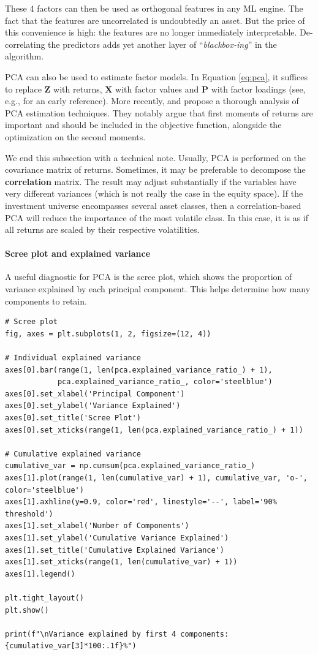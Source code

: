 \bigskip

These 4 factors can then be used as orthogonal features in any ML engine. The fact that the features are uncorrelated is undoubtedly an asset. But the price of this convenience is high: the features are no longer immediately interpretable. De-correlating the predictors adds yet another layer of ``\textit{blackbox-ing}'' in the algorithm.

PCA can also be used to estimate factor models. In Equation \ref{eq:pca}, it suffices to replace $\textbf{Z}$ with returns, $\textbf{X}$ with factor values and $\textbf{P}$ with factor loadings (see, e.g., \cite{connor1988risk} for an early reference). More recently, \cite{lettau2018estimating} and \cite{lettau2018factors} propose a thorough analysis of PCA estimation techniques. They notably argue that first moments of returns are important and should be included in the objective function, alongside the optimization on the second moments.

We end this subsection with a technical note. Usually, PCA is performed on the covariance matrix of returns. Sometimes, it may be preferable to decompose the \textbf{correlation} matrix. The result may adjust substantially if the variables have very different variances (which is not really the case in the equity space). If the investment universe encompasses several asset classes, then a correlation-based PCA will reduce the importance of the most volatile class. In this case, it is as if all returns are scaled by their respective volatilities.

\paragraph{Scree plot and explained variance}

A useful diagnostic for PCA is the scree plot, which shows the proportion of variance explained by each principal component. This helps determine how many components to retain.

\begin{verbatim}
# Scree plot
fig, axes = plt.subplots(1, 2, figsize=(12, 4))

# Individual explained variance
axes[0].bar(range(1, len(pca.explained_variance_ratio_) + 1), 
            pca.explained_variance_ratio_, color='steelblue')
axes[0].set_xlabel('Principal Component')
axes[0].set_ylabel('Variance Explained')
axes[0].set_title('Scree Plot')
axes[0].set_xticks(range(1, len(pca.explained_variance_ratio_) + 1))

# Cumulative explained variance
cumulative_var = np.cumsum(pca.explained_variance_ratio_)
axes[1].plot(range(1, len(cumulative_var) + 1), cumulative_var, 'o-', color='steelblue')
axes[1].axhline(y=0.9, color='red', linestyle='--', label='90% threshold')
axes[1].set_xlabel('Number of Components')
axes[1].set_ylabel('Cumulative Variance Explained')
axes[1].set_title('Cumulative Explained Variance')
axes[1].set_xticks(range(1, len(cumulative_var) + 1))
axes[1].legend()

plt.tight_layout()
plt.show()

print(f"\nVariance explained by first 4 components: {cumulative_var[3]*100:.1f}%")
\end{verbatim}

